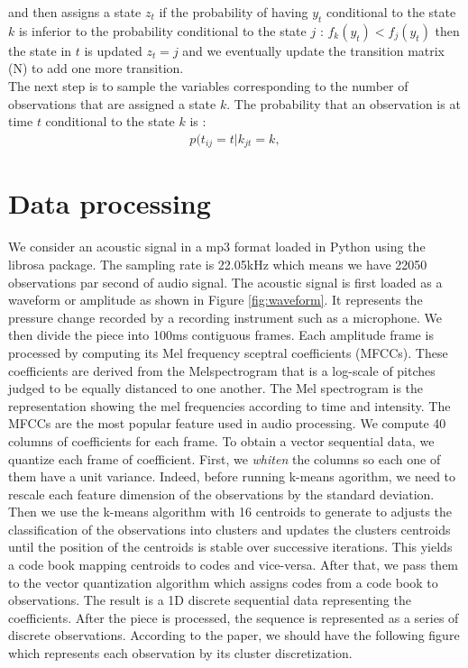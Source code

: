 and then assigns a state $z_t$ if the probability of having $y_t$ conditional to the state $k$ is inferior to the probability conditional to the state $j$  : $f_k(y_t)<f_j(y_t)$ then the state in $t$ is updated $z_t=j$ and we eventually update the transition matrix (N) to add one more transition. \\
The next step is to sample the variables corresponding to the number of observations that are assigned a state $k$. The probability that an observation is at time $t$ conditional to the state $k$ is  : \begin{align*}
	p(t_{ij}=t|k_{jt}=k, 
\end{align*}



\section{Data processing}
We consider an acoustic signal in a mp3 format loaded in Python using the librosa package. The sampling rate is 22.05kHz which means we have 22050 observations par second of audio signal. The acoustic signal is first loaded as a waveform or amplitude as shown in Figure \ref{fig:waveform}. It represents the pressure change recorded by a recording instrument such as a microphone. We then divide the piece into 100ms contiguous frames. Each amplitude frame is processed by computing its Mel frequency sceptral coefficients (MFCCs). These coefficients are derived from the Melspectrogram that is a log-scale of pitches judged to be equally distanced to one another. The Mel spectrogram is the representation showing the mel frequencies according to time and intensity. The MFCCs are the most popular feature used in audio processing. We compute 40 columns of coefficients for each frame. To obtain a vector sequential data, we quantize each frame of coefficient. First, we \textit{whiten} the columns so each one of them have a unit variance. Indeed, before running k-means agorithm, we need to rescale each feature dimension of the observations by the standard deviation. Then we use the k-means algorithm with 16 centroids to generate to adjusts the classification of the observations into clusters and updates the clusters centroids until the position of the centroids is stable over successive iterations. This yields a code book mapping centroids to codes and vice-versa. After that, we pass them to the vector quantization algorithm which assigns codes from a code book to observations. The result is a 1D discrete sequential data representing the coefficients. After the piece is processed, the sequence is represented as a series of discrete observations. According to the paper, we should have the following figure which represents each observation by its cluster discretization. 
